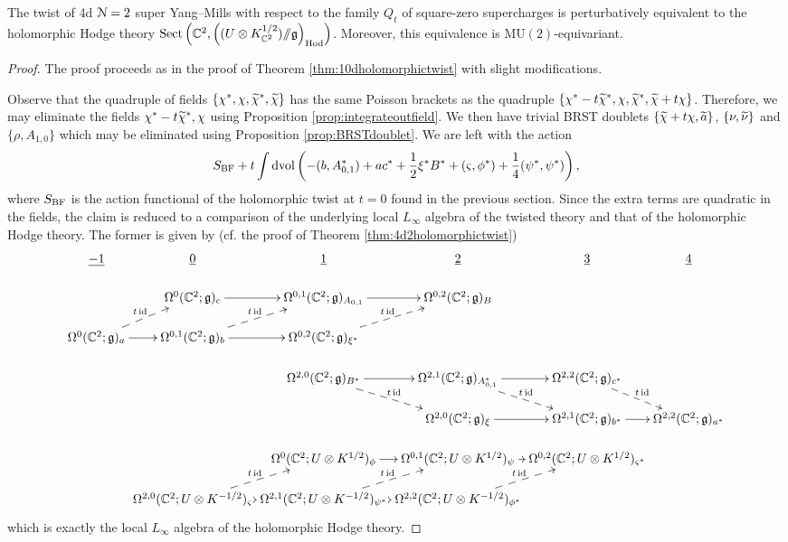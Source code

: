 \documentclass[10pt, oneside]{article}
\newcommand{\Hod}{\mathrm{Hod}}
\newcommand{\MU}{\mathrm{MU}}
\newcommand{\Sect}{\mathrm{Sect}}
\newcommand{\ham}{/\!\!/}
\begin{document}
\begin{theorem}
The twist of 4d $\mathcal N=2$ super Yang--Mills with respect to the family $Q_t$ of square-zero supercharges is perturbatively equivalent to the holomorphic Hodge theory $\Sect\left(\CC^2, \left((U\otimes K_{\CC^2}^{1/2})\ham \fg\right)_{\Hod}\right)$. Moreover, this equivalence is $\MU(2)$-equivariant.
\label{thm:4dDonaldsontwist}
\end{theorem}
\begin{proof}
The proof proceeds as in the proof of Theorem \ref{thm:10dholomorphictwist} with slight modifications.

Observe that the quadruple of fields $\{\chi^*, \chi, \widetilde{\chi}^*, \widetilde{\chi}\}$ has the same Poisson brackets as the quadruple $\{\chi^*-t\widetilde{\chi}^*, \chi, \widetilde{\chi}^*, \widetilde{\chi} + t\chi\}$. Therefore, we may eliminate the fields $\chi^*-t\widetilde{\chi}^*, \chi$ using Proposition \ref{prop:integrateoutfield}. We then have trivial BRST doublets $\{\widetilde{\chi} + t\chi, \widetilde{a}\}$, $\{\nu, \widetilde{\nu}\}$ and $\{\rho, A_{1, 0}\}$ which may be eliminated using Proposition \ref{prop:BRSTdoublet}. We are left with the action
\[S_{\mathrm{BF}} + t \int\operatorname{dvol}\left(-(b, A_{0, 1}^*) + a c^* + \frac{1}{2} \xi^* B^* + (\varsigma, \phi^*) + \frac 14 (\psi^*, \psi^*) \right),\]
where $S_{\mathrm{BF}}$ is the action functional of the holomorphic twist at $t=0$ found in the previous section. 
Since the extra terms are quadratic in the fields, the claim is reduced to a comparison of the underlying local $L_\infty$ algebra of the twisted theory and that of the holomorphic Hodge theory. The former is given by (cf. the proof of Theorem \ref{thm:4d2holomorphictwist})
\[
\xymatrix@R=0.5cm@C=0cm{
\ul{-1} & \ul{0} & \ul{1} & \ul{2} & \ul{3} & \ul{4} \\ 
& \Omega^0(\CC^2; \gg)_c \ar[r] &\Omega^{0,1}(\CC^2; \gg)_{A_{0,1}} \ar[r] &\Omega^{0,2}(\CC^2; \gg)_{B} \\
\Omega^0(\CC^2; \gg)_a  \ar@{-->}^{t\id}[ur] \ar[r] &\Omega^{0,1}(\CC^2; \gg)_{b}  \ar@{-->}^{t\id}[ur] \ar[r] &\Omega^{0,2}(\CC^2; \gg)_{\xi^*}  \ar@{-->}^{t\id}[ur] \\
& &  \Omega^{2,0}(\CC^2 ; \gg)_{B^*}  \ar@{-->}^{t\id}[dr] \ar[r] & \Omega^{2,1}(\CC^2 ; \gg)_{A_{0,1}^*} \ar[r]  \ar@{-->}^{t\id}[dr] & \Omega^{2,2}(\CC^2 ; \gg)_{c^*}  \ar@{-->}^{t\id}[dr] \\
& & & \Omega^{2,0}(\CC^2; \gg)_\xi \ar[r] &\Omega^{2,1}(\CC^2; \gg)_{b^*} \ar[r] &\Omega^{2,2}(\CC^2; \gg)_{a^*}  \\
& & \Omega^0(\CC^2 ; U\otimes K^{1/2})_\phi \ar[r] & \Omega^{0,1}(\CC^2 ; U\otimes K^{1/2})_\psi \ar[r] & \Omega^{0,2}(\CC^2 ; U\otimes K^{1/2})_{\varsigma^*} \\
& \Omega^{2,0}(\CC^2 ; U\otimes K^{-1/2})_{\varsigma} \ar[r]  \ar@{-->}^{t\id}[ur] & \Omega^{2,1}(\CC^2 ; U\otimes K^{-1/2})_{\psi^*} \ar[r]  \ar@{-->}^{t\id}[ur]  & \Omega^{2,2}(\CC^2 ; U\otimes K^{-1/2})_{\phi^*}  \ar@{-->}^{t\id}[ur]
}
\]
which is exactly the local $L_\infty$ algebra of the holomorphic Hodge theory.
\end{proof}
\end{document}
